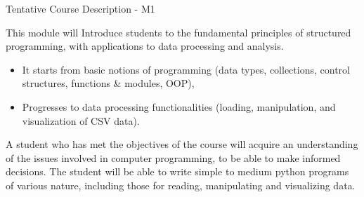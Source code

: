 \documentclass{beamer}%
\begin{document}


\begin{frame}{Tentative Course Description - M1}
\begin{block}{This module will }
Introduce students to the fundamental principles of structured programming, with applications to data processing and analysis. 
\begin{itemize}
	\item It starts from basic notions of programming (data types, collections, control structures, functions \& modules, OOP),
	\item Progresses to data processing functionalities (loading, manipulation, and visualization of CSV data).
\end{itemize}
\end{block}

\pause

\begin{block}{A student who has met the objectives of the course will}
 acquire an understanding of the issues involved in computer programming, to be able to make informed decisions. The student will be able to write simple to medium python programs of various nature, including those for reading, manipulating and visualizing data. %
\end{block}
\end{frame}
\end{document}
